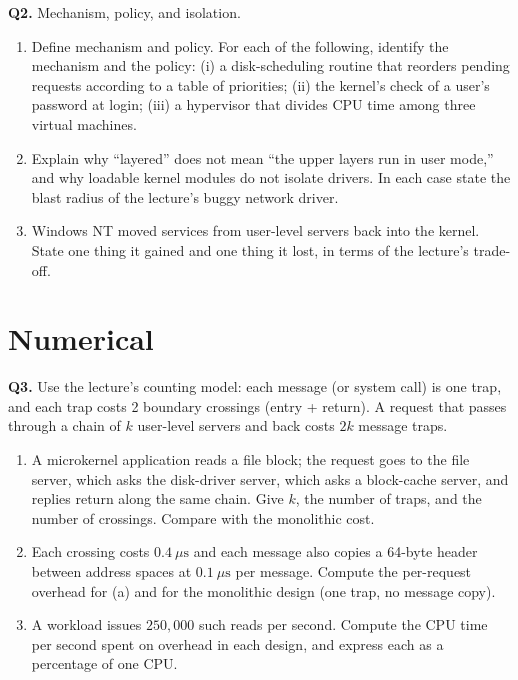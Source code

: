 \documentclass[11pt]{article}
\begin{document}
\textbf{Q2.} Mechanism, policy, and isolation.
\begin{enumerate}
  \item[(a)] Define mechanism and policy. For each of the following, identify the mechanism and the policy: (i) a disk-scheduling routine that reorders pending requests according to a table of priorities; (ii) the kernel's check of a user's password at login; (iii) a hypervisor that divides CPU time among three virtual machines.
  \item[(b)] Explain why ``layered'' does not mean ``the upper layers run in user mode,'' and why loadable kernel modules do not isolate drivers. In each case state the blast radius of the lecture's buggy network driver.
  \item[(c)] Windows NT moved services from user-level servers back into the kernel. State one thing it gained and one thing it lost, in terms of the lecture's trade-off.
\end{enumerate}

\section{Numerical}

\textbf{Q3.} Use the lecture's counting model: each message (or system call) is one trap, and each trap costs 2 boundary crossings (entry + return). A request that passes through a chain of $k$ user-level servers and back costs $2k$ message traps.
\begin{enumerate}
  \item[(a)] A microkernel application reads a file block; the request goes to the file server, which asks the disk-driver server, which asks a block-cache server, and replies return along the same chain. Give $k$, the number of traps, and the number of crossings. Compare with the monolithic cost.
  \item[(b)] Each crossing costs $0.4~\mu\text{s}$ and each message also copies a 64-byte header between address spaces at $0.1~\mu\text{s}$ per message. Compute the per-request overhead for (a) and for the monolithic design (one trap, no message copy).
  \item[(c)] A workload issues $250{,}000$ such reads per second. Compute the CPU time per second spent on overhead in each design, and express each as a percentage of one CPU.
\end{enumerate}
\end{document}
